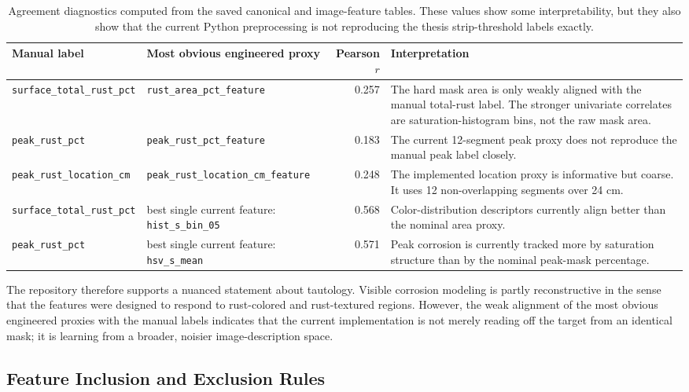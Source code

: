\documentclass[11pt,a4paper]{article}
\begin{document}
\begin{table}[H]
\centering
\small
\begin{tabular}{P{3.6cm}P{4.0cm}rP{5.0cm}}
\toprule
\textbf{Manual label} & \textbf{Most obvious engineered proxy} & \textbf{Pearson \(r\)} & \textbf{Interpretation} \\
\midrule
\texttt{surface\_total\_rust\_pct} & \texttt{rust\_area\_pct\_feature} & 0.257 & The hard mask area is only weakly aligned with the manual total-rust label. The stronger univariate correlates are saturation-histogram bins, not the raw mask area. \\
\texttt{peak\_rust\_pct} & \texttt{peak\_rust\_pct\_feature} & 0.183 & The current 12-segment peak proxy does not reproduce the manual peak label closely. \\
\texttt{peak\_rust\_location\_cm} & \texttt{peak\_rust\_location\_cm\_feature} & 0.248 & The implemented location proxy is informative but coarse. It uses 12 non-overlapping segments over 24 cm. \\
\texttt{surface\_total\_rust\_pct} & best single current feature: \texttt{hist\_s\_bin\_05} & 0.568 & Color-distribution descriptors currently align better than the nominal area proxy. \\
\texttt{peak\_rust\_pct} & best single current feature: \texttt{hsv\_s\_mean} & 0.571 & Peak corrosion is currently tracked more by saturation structure than by the nominal peak-mask percentage. \\
\bottomrule
\end{tabular}
\caption{Agreement diagnostics computed from the saved canonical and image-feature tables. These values show some interpretability, but they also show that the current Python preprocessing is not reproducing the thesis strip-threshold labels exactly.}
\label{tab:feature-agreement}
\end{table}

The repository therefore supports a nuanced statement about tautology. Visible corrosion modeling is partly reconstructive in the sense that the features were designed to respond to rust-colored and rust-textured regions. However, the weak alignment of the most obvious engineered proxies with the manual labels indicates that the current implementation is not merely reading off the target from an identical mask; it is learning from a broader, noisier image-description space.

\subsection{Feature Inclusion and Exclusion Rules}
\end{document}

